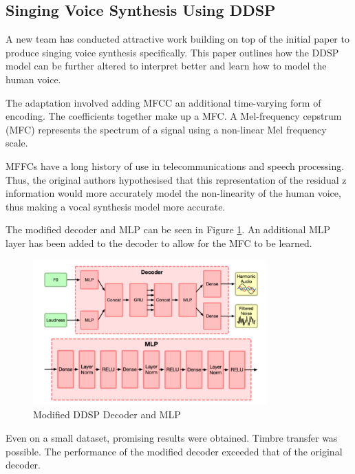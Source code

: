 \subsection{Singing Voice Synthesis Using DDSP}
\label{sec:singing_voice_synthesis}

A new team has conducted attractive work building on top of the initial paper to produce singing voice synthesis\cite{SingingDDSP} specifically. This paper outlines how the DDSP model can be further altered to interpret better and learn how to model the human voice.

The adaptation involved adding \acrfull{MFCC} an additional time-varying form of encoding. The coefficients together make up a \acrfull{MFC}. A Mel-frequency cepstrum (MFC) represents the spectrum of a signal using a non-linear Mel frequency scale.

MFFCs have a long history of use in telecommunications and speech processing\cite{MFCCHistory}. Thus, the original authors hypothesised that this representation of the residual z information would more accurately model the non-linearity of the human voice, thus making a vocal synthesis model more accurate.

The modified decoder and MLP can be seen in Figure \ref{fig:singing_decoder_mlp}. An additional MLP layer has been added to the decoder to allow for the MFC to be learned.

\begin{figure}[H]
    \centering
    \includegraphics[width=0.8\textwidth]{literature_review/SingingDecoderMLP.png}
    \caption{Modified DDSP Decoder and MLP\cite{SingingDDSP}}
    \label{fig:singing_decoder_mlp}
\end{figure}

Even on a small dataset, promising results were obtained. Timbre transfer was possible. The performance of the modified decoder exceeded that of the original decoder.

